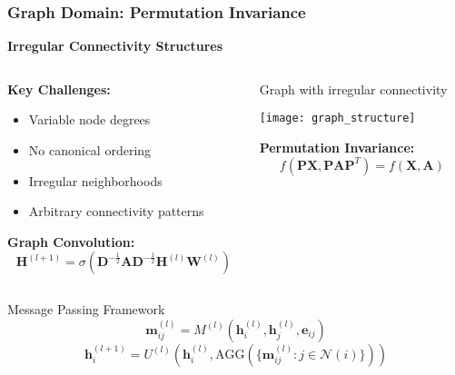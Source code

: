 \begin{frame}[fragile]\frametitle{Graph Domain: Permutation Invariance}

\begin{center}
\textbf{Irregular Connectivity Structures}
\end{center}

\begin{columns}
\begin{column}{0.6\textwidth}
\textbf{Key Challenges:}
\begin{itemize}
\item Variable node degrees
\item No canonical ordering
\item Irregular neighborhoods
\item Arbitrary connectivity patterns
\end{itemize}

\textbf{Graph Convolution:}
$$\mathbf{H}^{(l+1)} = \sigma\left(\mathbf{D}^{-\frac{1}{2}}\mathbf{A}\mathbf{D}^{-\frac{1}{2}}\mathbf{H}^{(l)}\mathbf{W}^{(l)}\right)$$


\end{column}
\begin{column}{0.4\textwidth}
{\small Graph with irregular connectivity}

\begin{center}
\texttt{[image: graph\_structure]}
\end{center}

\textbf{Permutation Invariance:}
$$f(\mathbf{P}\mathbf{X}, \mathbf{P}\mathbf{A}\mathbf{P}^T) = f(\mathbf{X}, \mathbf{A})$$
\end{column}
\end{columns}

\begin{exampleblock}{Message Passing Framework}
$$\mathbf{m}_{ij}^{(l)} = M^{(l)}(\mathbf{h}_i^{(l)}, \mathbf{h}_j^{(l)}, \mathbf{e}_{ij})$$
$$\mathbf{h}_i^{(l+1)} = U^{(l)}\left(\mathbf{h}_i^{(l)}, \text{AGG}\left(\{\mathbf{m}_{ij}^{(l)} : j \in \mathcal{N}(i)\}\right)\right)$$
\end{exampleblock}

\end{frame}

